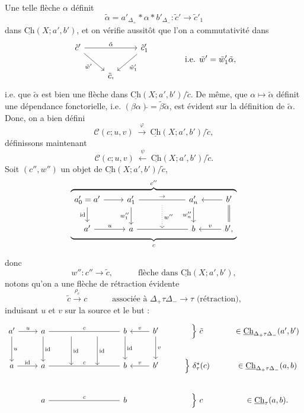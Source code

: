 \documentclass[11pt]{article}
\newcommand{\printedpage}[1]{\marginpar{\footnotesize p.~#1}}
\newcommand{\msp}[1]{\marginpar{\footnotesize [#1]}}
\newcommand{\Ch}{\underline{\mathrm{Ch}}}
\newcommand{\cC}{\mathcal{C}}
\begin{document}
Une telle flèche $\alpha$ définit
\[
\tilde{\alpha} = a'_{\Delta_{+}} \ast \alpha \ast b'_{\Delta_{-}} : \tilde{c}' \longrightarrow \tilde{c}'_1
\]
dans $\Ch(X;a',b')$, et on vérifie
\msp{page 164}
aussitôt que l'on a commutativité dans
\[
\begin{tikzcd}
\tilde{c}' \ar[rr,"\tilde{\alpha}"] \ar[dr,"\tilde{w}'"'] & & \tilde{c}'_1 \ar[dl,"\tilde{w}'_1"] \\
& \tilde{c}, &
\end{tikzcd}
\qquad\qquad \text{i.e. } \tilde{w}' = \tilde{w}'_1\tilde{\alpha},
\]
i.e. que $\tilde{\alpha}$ est bien une flèche dans $\Ch(X;a',b')/\tilde{c}$. De même, que $\alpha \longmapsto \tilde{\alpha}$ définit une dépendance fonctorielle, i.e. $(\beta\alpha)\tilde{} = \tilde{\beta}\tilde{\alpha}$, est évident sur la définition de $\tilde{\alpha}$. Donc, on a bien défini %
\[
\cC(c;u,v) \ \xrightarrow{\ \varphi\ }\ \Ch(X;a',b')/\tilde{c},
\]
définissons maintenant
\[
\cC(c;u,v) \ \xleftarrow{\ \psi\ }\ \Ch(X;a',b')/\tilde{c}.
\]
Soit $(c'',w'')$ un objet de $\Ch(X;a',b')/\tilde{c}$,
\[
\overbrace{\underbrace{\begin{tikzcd}[ampersand replacement=\&]
a'_0 = a' \ar[r] \ar[d,"\mathrm{id}"'] \& a'_1 \ar[rr,no head,"\rightarrow"] \ar[d,"w''_1"'] \& {} \ar[d,dotted,"w''"] \& a'_n \ar[d,"w''_n"'] \& b' \ar[l] \ar[d,equal] \\
a' \ar[r,"u"] \& a \ar[rr,no head] \& {} \& b \& b', \ar[l,"v"']
\end{tikzcd}}_{c}}^{c''}
\]

\printedpage{103}
donc
\[
w'' : c'' \longrightarrow \tilde{c}, \qquad\quad \text{flèche dans } \Ch(X;a',b'),
\]
notons qu'on a une flèche de rétraction évidente
\[
\tilde{c} \xrightarrow{\rho_c} c \qquad\quad \text{associée à } \Delta_{+}\tau\Delta_{-} \longrightarrow \tau \text{ (rétraction),}
\]
induisant $u$ et $v$ sur la source et le but :
\[
\begin{tikzcd}
a' \ar[r,"u"] \ar[d,"u"] & a \ar[rrr,no head,"c"] \ar[d,"\mathrm{id}"] & {} \ar[d,"\mathrm{id}"] & {} \ar[d,"\mathrm{id}"] & b \ar[d,"\mathrm{id}"] & b' \ar[l,"v"'] \ar[d,"v"] & \Big\}\ \tilde{c} & \in \Ch_{\Delta_{+}\tau\Delta_{-}}(a',b') \\
a \ar[r,"\mathrm{id}"] & a \ar[rrr,no head,"c"] & {} & {} & b & b' \ar[l,"v"'] & \Big\}\ \delta^{*}_{\tau}(c) & \in \Ch_{\Delta_{+}\tau\Delta_{-}}(a,b) \\
& a \ar[rrr,no head,"c"] & & & b & & \Big\}\ c & \in \Ch_{\tau}(a,b).
\end{tikzcd}
\]
\end{document}
